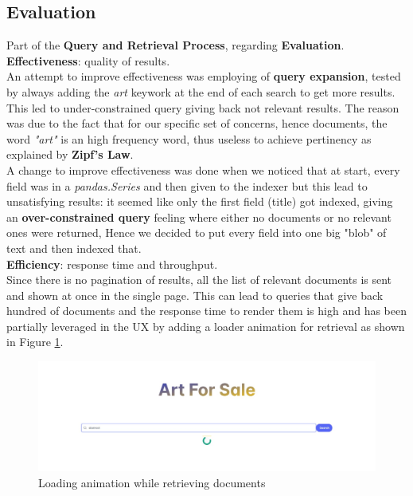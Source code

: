 \documentclass[12pt]{spieman}  %
\begin{document}
\begin{spacing}{1}
    \section{Evaluation}\label{sec:evaluation}
    Part of the \textbf{Query and Retrieval Process}, regarding \textbf{Evaluation}.\\
    \newline
    \textbf{Effectiveness}: quality of results.\\
    An attempt to improve effectiveness was employing of \textbf{query expansion},
    tested by always adding the \textit{art} keywork at the end of each search to get more results.
    This led to under-constrained query giving back not relevant results.
    The reason was due to the fact that for our specific set of concerns, hence documents, the word
    \textit{"art"} is an high frequency word, thus useless to achieve pertinency as explained by
    \textbf{Zipf's Law}.\\
    A change to improve effectiveness was done when we noticed that at start,
    every field was in a \textit{pandas.Series} and then given to the indexer but this lead to
    unsatisfying results: it seemed like only the first field (title) got indexed,
    giving an \textbf{over-constrained query} feeling where
    either no documents or no relevant ones were returned,
    Hence we decided to put every field into one big "blob" of text and then indexed that.\\
    \newline
    \textbf{Efficiency}: response time and throughput.\\
    Since there is no pagination of results, all the list of relevant documents is sent
    and shown at once in the single page.
    This can lead to queries that give back hundred of documents
    and the response time to render them is high and has been partially leveraged
    in the UX by adding a loader animation for retrieval as shown in Figure \ref{fig:loader}.

    \begin{figure}[H]
        \centering
        \caption{Loading animation while retrieving documents}
        \label{fig:loader}
        \includegraphics[width=\textwidth, trim={7cm 0cm 7cm 0cm}, clip]{figures/loading.jpeg}
    \end{figure}


\end{spacing}
\end{document}
